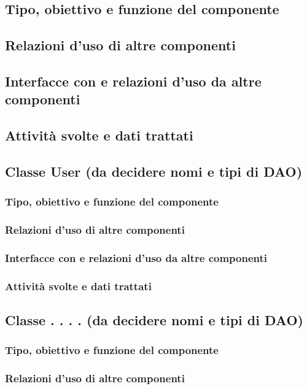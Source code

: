 \subsection*{Tipo, obiettivo e funzione del componente}
\subsection*{Relazioni d'uso di altre componenti}
\subsection*{Interfacce con e relazioni d'uso da altre componenti}
\subsection*{Attivit\`a svolte e dati trattati}

\subsection{Classe User (da decidere nomi e tipi di DAO)}
\subsubsection*{Tipo, obiettivo e funzione del componente}
\subsubsection*{Relazioni d'uso di altre componenti}
\subsubsection*{Interfacce con e relazioni d'uso da altre componenti}
\subsubsection*{Attivit\`a svolte e dati trattati}

\subsection{Classe . . . . (da decidere nomi e tipi di DAO)}
\subsubsection*{Tipo, obiettivo e funzione del componente}
\subsubsection*{Relazioni d'uso di altre componenti}
